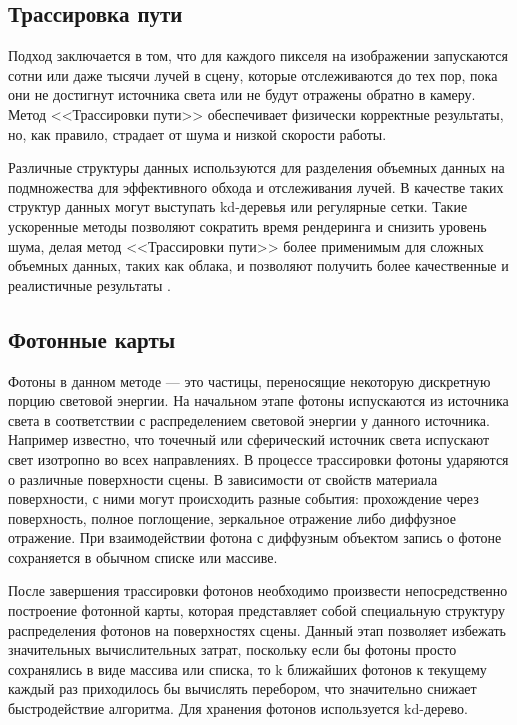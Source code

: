 {	
	\subsection{Трассировка пути}
	
	Подход заключается в том, что для каждого пикселя на изображении запускаются сотни или даже тысячи лучей в сцену, которые отслеживаются до тех пор, пока они не достигнут источника света или не будут отражены обратно в камеру. Метод <<Трассировки пути>> обеспечивает физически корректные результаты, но, как правило, страдает от шума и низкой скорости работы.
	
	Различные структуры данных используются для разделения объемных данных на подмножества для эффективного обхода и отслеживания лучей. В качестве таких структур данных могут выступать kd-деревья или регулярные сетки. Такие ускоренные методы позволяют сократить время рендеринга и снизить уровень шума, делая метод <<Трассировки пути>> более применимым для сложных объемных данных, таких как облака, и позволяют получить более качественные и реалистичные результаты \cite{clouds}.
	
	\subsection{Фотонные карты}
	
	Фотоны в данном методе — это частицы, переносящие некоторую дискретную порцию световой энергии. На начальном этапе фотоны испускаются из источника света в соответствии с распределением световой энергии у данного источника. Например известно, что точечный или сферический источник света испускают свет изотропно во всех направлениях. В  процессе  трассировки  фотоны  ударяются  о  различные  поверхности  сцены.  В 
	зависимости от свойств материала поверхности, с ними могут происходить разные события: 
	прохождение через поверхность, полное поглощение, зеркальное отражение либо диффузное отражение. При  взаимодействии  фотона  с  диффузным  объектом  запись  о  фотоне 
	сохраняется в обычном списке или массиве. 
	
	После  завершения  трассировки  фотонов  необходимо  произвести  непосредственно 
	построение  фотонной  карты,  которая  представляет  собой  специальную  структуру 
	распределения  фотонов  на  поверхностях  сцены.  Данный  этап  позволяет  избежать 
	значительных вычислительных затрат, поскольку если бы фотоны просто сохранялись в виде 
	массива  или  списка,  то  k  ближайших  фотонов  к  текущему  каждый  раз  приходилось  бы 
	вычислять перебором, что значительно снижает быстродействие алгоритма. Для хранения фотонов используется kd-дерево.
	
}

